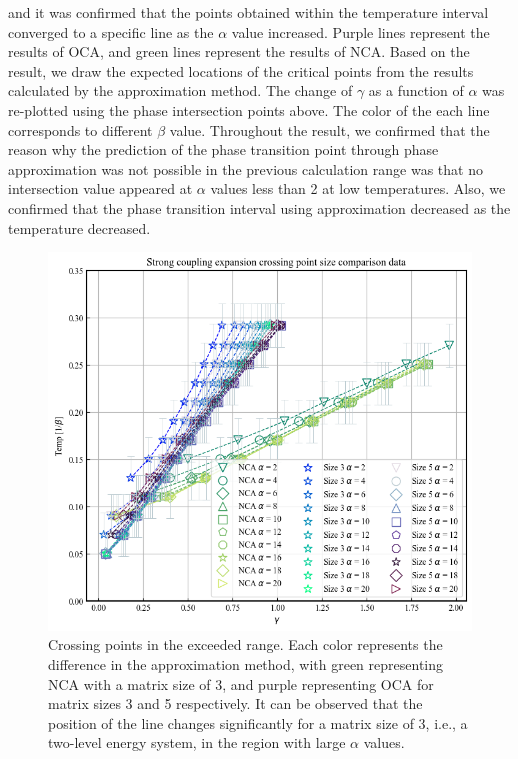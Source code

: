\documentclass{article}[12pt]
\begin{document}
\begin{spacing}{1.5}
and it was confirmed that the points obtained within the temperature interval converged to a specific line as the $\alpha$ value increased. 
Purple lines represent the results of OCA, and green lines represent the results of NCA. 
Based on the result, we draw the expected locations of the critical points from the results calculated by the approximation method. 
The change of $\gamma$ as a function of $\alpha$ was re-plotted using the phase intersection points above. 
The color of the each line corresponds to different $\beta$ value.
Throughout the result, we confirmed that the reason why the prediction of the phase transition point through phase approximation was not possible 
in the previous calculation range was that no intersection value appeared at $\alpha$ values less than 2 at low temperatures. 
Also, we confirmed that the phase transition interval using approximation decreased as the temperature decreased.
\pagebreak
\begin{figure}[H]
  \centerline{\includegraphics[width=12cm]{TexFigure/output.png}}
  \caption{Crossing points in the exceeded range. Each color represents the difference in the approximation method, 
  with green representing NCA with a matrix size of 3,  and purple representing OCA for matrix sizes 3 and 5 respectively. 
  It can be observed that the position of the line changes significantly for a matrix size of 3, i.e., a two-level energy system, 
  in the region with large $\alpha$ values.}
\end{figure}
\begin{figure}[htbp]

\end{figure}
\end{spacing}
\end{document}
